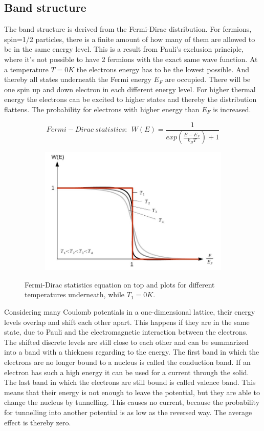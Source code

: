 \documentclass[]{article}
\begin{document}
\subsection{Band structure}
  The band structure is derived from the Fermi-Dirac distribution. For fermions, spin=1/2 particles, there is a finite amount of how many of them are allowed to be in the same energy level. This is a result from Pauli's exclusion principle, where it's not possible to have 2 fermions with the exact same wave function. At a temperature $T=0K$ the electrons energy has to be the lowest possible. And thereby all states underneath the Fermi energy $E_F$ are occupied. There will be one spin up and down electron in each different energy level. For higher thermal energy the electrons can be excited to higher states and thereby the distribution flattens. The probability for electrons with higher energy than $E_F$ is increased.

\begin{figure}[H]
\centering
\begin{subfigure}[b]{1\textwidth}
	\centering
	\begin{equation}
	Fermi-Dirac \ statistics: \:\: W(E) = \frac{1}{exp\left(\frac{E-E_F}{k_B T}\right)+1} 
	\end{equation}
\end{subfigure}
\begin{subfigure}[b]{1\textwidth}
	\centering
	\includegraphics[width=.7\textwidth]{Plots/fd.png}
\end{subfigure}
\caption{Fermi-Dirac statistics equation on top and plots for different temperatures underneath, while $T_1=0K$. \cite{wiki}}
\end{figure}

Considering many Coulomb potentials in a one-dimensional lattice, their energy levels overlap and shift each other apart. This happens if they are in the same state, due to Pauli and the electromagnetic interaction between the electrons. The shifted discrete levels are still close to each other and can be summarized into a band with a thickness regarding to the energy. The first band in which the electrons are no longer bound to a nucleus is called the conduction band. If an electron has such a high energy it can be used for a current through the solid. The last band in which the electrons are still bound is called valence band. This means that their energy is not enough to leave the potential, but they are able to change the nucleus by tunnelling. This causes no current, because the probability for tunnelling into another potential is as low as the reversed way. The average effect is thereby zero.
\end{document}
